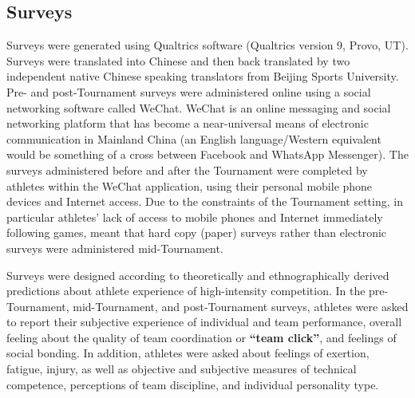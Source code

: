 \subsection{Surveys}
Surveys were generated using Qualtrics software (Qualtrics version 9, Provo, UT). Surveys were translated into Chinese and then back translated by two independent native Chinese speaking translators from Beijing Sports University.  Pre- and post-Tournament surveys were administered online using a social networking software called WeChat. WeChat is an online messaging and social networking platform that has become a near-universal means of electronic communication in Mainland China (an English language/Western equivalent would be something of a cross between Facebook and WhatsApp Messenger). The surveys administered before and after the Tournament were completed by athletes within the WeChat application, using their personal mobile phone devices and Internet access. Due to the constraints of the Tournament setting, in particular athletes’ lack of access to mobile phones and Internet immediately following games, meant that hard copy (paper) surveys rather than electronic surveys were administered mid-Tournament.

Surveys were designed according to theoretically and ethnographically derived predictions about athlete experience of high-intensity competition.  In the pre-Tournament, mid-Tournament, and post-Tournament surveys, athletes were asked to report their subjective experience of individual and team performance, overall feeling about the quality of team coordination or \textbf{``team click''}, and feelings of social bonding.  In addition, athletes were asked about feelings of exertion, fatigue, injury, as well as objective and subjective measures of technical competence, perceptions of team discipline, and individual personality type.




